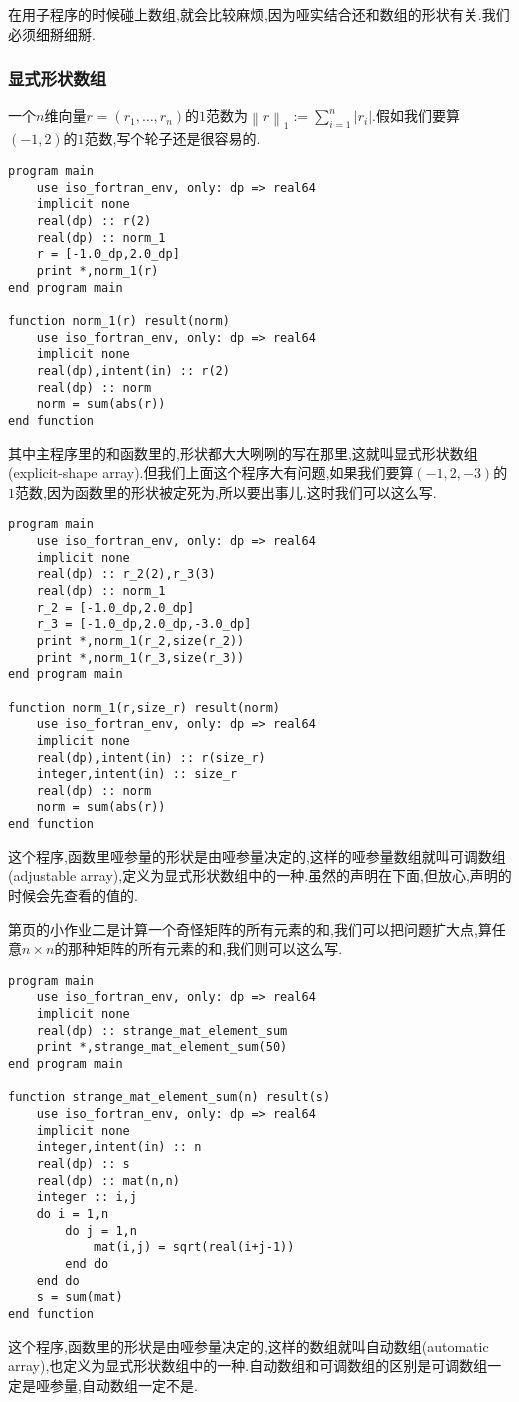 在用子程序的时候碰上数组,就会比较麻烦,因为哑实结合还和数组的形状有关.我们必须细掰细掰.

\subsubsection{显式形状数组}
一个$n$维向量$r=(r_1,\dots,r_n)$的$1$范数为$\left\lVert r\right\rVert_1:=\sum_{i=1}^n\left\lvert r_i\right\rvert $.假如我们要算$(-1,2)$的$1$范数,写个轮子还是很容易的.
\begin{lstlisting}
program main
    use iso_fortran_env, only: dp => real64
    implicit none
    real(dp) :: r(2)
    real(dp) :: norm_1
    r = [-1.0_dp,2.0_dp]
    print *,norm_1(r)
end program main

function norm_1(r) result(norm)
    use iso_fortran_env, only: dp => real64
    implicit none
    real(dp),intent(in) :: r(2)
    real(dp) :: norm
    norm = sum(abs(r))
end function
\end{lstlisting}
其中主程序里的和函数里的,形状都大大咧咧的写在那里,这就叫显式形状数组(explicit-shape array).但我们上面这个程序大有问题,如果我们要算$(-1,2,-3)$的$1$范数,因为函数里的形状被定死为\ttt{[2]},所以要出事儿.这时我们可以这么写.\label{adjustable_array}
\begin{lstlisting}
program main
    use iso_fortran_env, only: dp => real64
    implicit none
    real(dp) :: r_2(2),r_3(3)
    real(dp) :: norm_1
    r_2 = [-1.0_dp,2.0_dp]
    r_3 = [-1.0_dp,2.0_dp,-3.0_dp]
    print *,norm_1(r_2,size(r_2))
    print *,norm_1(r_3,size(r_3))
end program main

function norm_1(r,size_r) result(norm)
    use iso_fortran_env, only: dp => real64
    implicit none
    real(dp),intent(in) :: r(size_r)
    integer,intent(in) :: size_r
    real(dp) :: norm
    norm = sum(abs(r))
end function
\end{lstlisting}
这个程序,函数里哑参量的形状是由哑参量决定的,这样的哑参量数组就叫可调数组(adjustable array),定义为显式形状数组中的一种.虽然的声明在下面,但放心,声明的时候会先查看的值的.

第\pageref{hw_2}页的小作业二是计算一个奇怪矩阵的所有元素的和,我们可以把问题扩大点,算任意$n\times n$的那种矩阵的所有元素的和,我们则可以这么写.
\begin{lstlisting}
program main
    use iso_fortran_env, only: dp => real64
    implicit none
    real(dp) :: strange_mat_element_sum
    print *,strange_mat_element_sum(50)
end program main

function strange_mat_element_sum(n) result(s)
    use iso_fortran_env, only: dp => real64
    implicit none
    integer,intent(in) :: n
    real(dp) :: s
    real(dp) :: mat(n,n)
    integer :: i,j
    do i = 1,n
        do j = 1,n
            mat(i,j) = sqrt(real(i+j-1))
        end do
    end do
    s = sum(mat)
end function
\end{lstlisting}
这个程序,函数里的形状是由哑参量决定的,这样的数组就叫自动数组(automatic array),也定义为显式形状数组中的一种.自动数组和可调数组的区别是可调数组一定是哑参量,自动数组一定不是.

